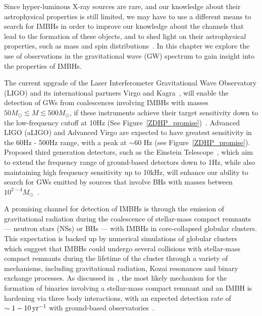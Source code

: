 Since hyper-luminous X-ray sources are rare, and our knowledge about their astrophysical properties is still limited, we may have to use a different means to search for IMBHs in order to improve our knowledge about the channels that lead to the formation of these objects, and to shed light on their astrophysical properties, such as mass and spin distributions~\cite{mandel}. In this chapter we explore the use of observations in the gravitational wave (GW) spectrum to gain insight into the properties of IMBHs. 

The current upgrade of the Laser Interferometer Gravitational Wave Observatory (LIGO) and its international partners Virgo and Kagra~\cite{aLIGO, virgo,kagra}, will enable the detection of GWs from coalescences involving IMBHs with masses \(50 M_{\odot} \lesssim M \lesssim 500 M_{\odot}\), if these instruments achieve their target sensitivity down to the low-frequency cutoff at 10Hz (See Figure~\ref{ZDHP_promise})~\cite{ZDHP:2010}.  Advanced LIGO (aLIGO) and Advanced Virgo are expected to have greatest sensitivity in the 60Hz - 500Hz range, with a peak at \(\sim60\) Hz (see Figure~\ref{ZDHP_promise}). Proposed third generation detectors, such as the Einstein Telescope~\cite{Freise:2009}, which aim to extend the frequency range of ground-based detectors down to 1Hz, while also maintaining high frequency sensitivity up to 10kHz, will enhance our ability to search for GWs emitted by sources that involve BHs with masses between \(10^{2-4}M_{\odot}\)~\cite{etgair,Huerta:2011a,Huerta:2011b}. 


A promising channel for detection of IMBHs is through the emission of gravitational radiation during the coalescence of stellar-mass compact remnants --- neutron stars (NSs) or BHs --- with IMBHs in core-collapsed globular clusters. This expectation is backed up by numerical simulations of globular clusters~\cite{Taniguchi:2000,Miller:2002,Mouri:2002a,Mouri:2002b,Gultekin:2004,Gultekin:2006,Oleary:2006,Oleary:2007}  which suggest that IMBHs could undergo several collisions with stellar-mass compact remnants during the lifetime of the cluster through a variety of mechanisms, including gravitational radiation, Kozai resonances and binary exchange processes.  As discussed in~\cite{man}, the most likely mechanism for the formation of binaries involving a stellar-mass compact remnant and an IMBH is hardening via three body interactions, with an expected detection rate of \(\sim 1-10\, {\rm{yr}}^{-1}\) with ground-based observatories~\cite{man,Abadie:2010}. 

